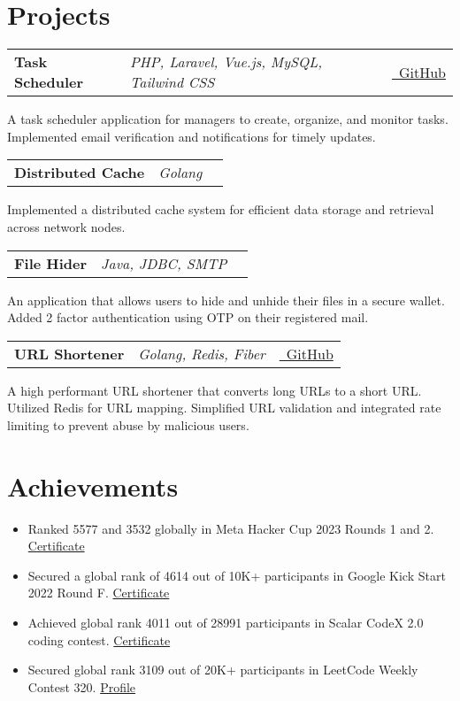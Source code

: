 \documentclass[a4paper,10pt]{article}
\makeatletter
\newenvironment{jobshort}[3]
    {
    \begin{tabularx}{\linewidth}{@{}l X r@{}}
    \textbf{#1} & \textit{#2} &  #3 \\[3pt]
    \end{tabularx}
    }
    {
    }
\makeatother
\begin{document}
  
\section{Projects}
\vspace{-4pt}
\begin{jobshort}{Task Scheduler}{PHP, Laravel, Vue.js, MySQL, Tailwind CSS}{\href{https://github.com/sagnik6969/task_scheduler_frontend}{\raisebox{-0.05\height}\faGithub\ GitHub}}
    A task scheduler application for managers to create, organize, and monitor tasks. Implemented email verification and
notifications for timely updates.
\end{jobshort}

\begin{jobshort}{Distributed Cache}{Golang}{}
    Implemented a distributed cache system for efficient data storage and retrieval across network nodes.
\end{jobshort}

\begin{jobshort}{File Hider}{Java, JDBC, SMTP}{}
    An application that allows users to hide and unhide their files in a secure wallet. Added 2 factor authentication using OTP
    on their registered mail.
\end{jobshort}

\begin{jobshort}{URL Shortener}{Golang, Redis, Fiber}{\href{https://github.com/sameertrip123/url-shortener}{\raisebox{-0.05\height}\faGithub\ GitHub}}
    A high performant URL shortener that converts long URLs to a short URL. Utilized Redis for URL mapping. Simplified
    URL validation and integrated rate limiting to prevent abuse by malicious users.
\end{jobshort}



\section{Achievements}
\vspace{-4pt}
\begin{itemize}[nosep,after=\strut, leftmargin=1em, itemsep=2pt,label=--]
    \item Ranked 5577 and 3532 globally in Meta Hacker Cup 2023 Rounds 1 and 2. \href{https://www.facebook.com/codingcompetitions/hacker-cup/2023/certificate/2037824066570201}{Certificate}
    \item Secured a global rank of 4614 out of 10K+ participants in Google Kick Start 2022 Round F. \href{https://drive.google.com/file/d/1yJX57VkI7LnC7MsX_Wz_063uCRgkH8W3/view}{Certificate}
    \item Achieved global rank 4011 out of 28991 participants in Scalar CodeX 2.0 coding contest. \href{https://moonshot.scaler.com/s/sl/p3M5EL9en3}{Certificate}
    \item Secured global rank 3109 out of 20K+ participants in LeetCode Weekly Contest 320. \href{https://leetcode.com/u/sameertri039/}{Profile}
\end{itemize}
\end{document}
